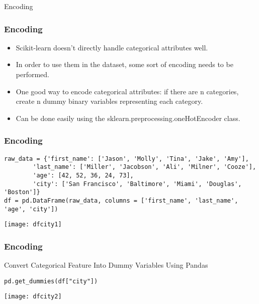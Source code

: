\begin{frame}
  \begin{center}
    {\Large Encoding}
  \end{center}
\end{frame}

\begin{frame}[fragile]\frametitle{Encoding}
	\begin{itemize}
	\item Scikit-learn doesn't directly handle categorical attributes well.
	\item In order to use them in the dataset, some sort of encoding needs to be performed.
	\item One good way to encode categorical attributes: if there are n categories, create n dummy binary variables representing each category.
	\item Can be done easily using the sklearn.preprocessing.oneHotEncoder class.
	\end{itemize}
\end{frame}

\begin{frame}[fragile]\frametitle{Encoding}
\begin{lstlisting}
raw_data = {'first_name': ['Jason', 'Molly', 'Tina', 'Jake', 'Amy'], 
        'last_name': ['Miller', 'Jacobson', 'Ali', 'Milner', 'Cooze'], 
        'age': [42, 52, 36, 24, 73], 
        'city': ['San Francisco', 'Baltimore', 'Miami', 'Douglas', 'Boston']}
df = pd.DataFrame(raw_data, columns = ['first_name', 'last_name', 'age', 'city'])
\end{lstlisting}
\begin{center}
\texttt{[image: dfcity1]}
\end{center}
\end{frame}

\begin{frame}[fragile]\frametitle{Encoding}
Convert Categorical Feature Into Dummy Variables Using Pandas
\begin{lstlisting}
pd.get_dummies(df["city"])
\end{lstlisting}
\begin{center}
\texttt{[image: dfcity2]}
\end{center}
\end{frame}

